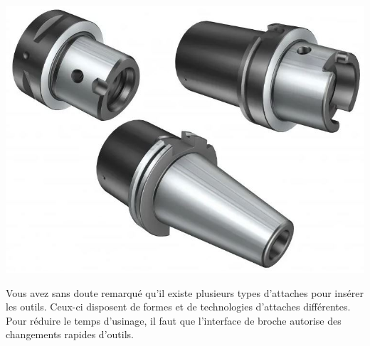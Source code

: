 \documentclass[12pt]{article}
\begin{document}
\begin{minipage}{.55\linewidth}
\includegraphics[width=0.7\linewidth]{Images/Outil3.JPG}
\end{minipage}
\begin{minipage}{.44\linewidth}
Vous avez sans doute remarqué qu'il existe plusieurs types d'attaches pour insérer les outils. Ceux-ci disposent de formes et de technologies d'attaches différentes. Pour réduire le temps d'usinage, il faut que l'interface de broche autorise des changements rapides d'outils. 
\end{minipage}

\end{document}
